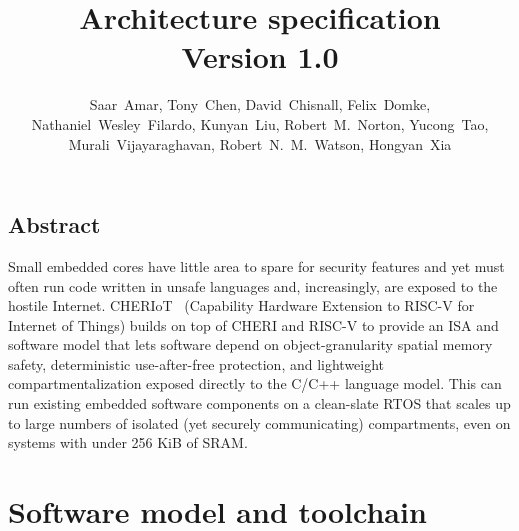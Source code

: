 \documentclass[12pt,letterpaper,twoside,openright,fleqn]{report}
\begin{document}
\title{\cherimcu{} Architecture specification\\
  Version 1.0}
\author{
  \parbox{\linewidth}{\centering%
    Saar~Amar,
    Tony~Chen,
    David~Chisnall,
    Felix~Domke,
    Nathaniel~Wesley~Filardo,
    Kunyan~Liu,
    Robert~M.~Norton,
    Yucong~Tao,
    Murali~Vijayaraghavan,
    Robert~N.~M.~Watson,
    Hongyan~Xia
  }%
}

\begin{minipage}[h]{\textwidth}
  \vspace{-.2cm}
  \maketitle
\end{minipage}

\normalsize


\clearpage

\chapter*{Abstract}

Small embedded cores have little area to spare for security features and yet must often run code written in unsafe languages and, increasingly, are exposed to the hostile Internet.
CHERIoT  (Capability Hardware Extension to RISC-V for Internet of Things) builds on top of CHERI and RISC-V to provide an ISA and software model that lets software depend on object-granularity spatial memory safety, deterministic use-after-free protection, and lightweight compartmentalization exposed directly to the C/C++ language model.
This can run existing embedded software components on a clean-slate RTOS that scales up to large numbers of isolated (yet securely communicating) compartments, even on systems with under 256 KiB of SRAM.

\clearpage



\clearpage



\clearpage



\clearpage

\tableofcontents

\part{Software model and toolchain}
\label{part:sw}
\end{document}

